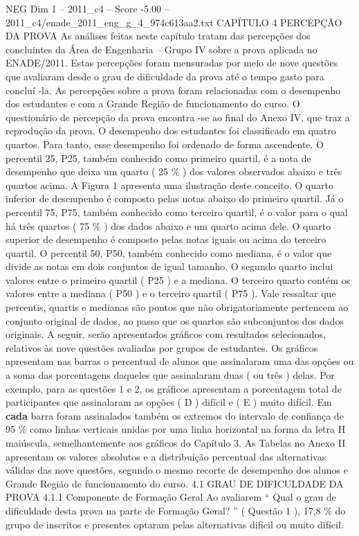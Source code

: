 \begin{textsample}{NEG Dim 1 – 2011\_c4 – Score -5.00 – 2011\_c4/enade\_2011\_eng\_g\_4\_974c613aa2.txt}  \label{ex:f1_neg_112}
CAPÍTULO 4 PERCEPÇÃO DA PROVA As análises feitas neste capítulo tratam das percepções dos concluintes da Área de Engenharia – Grupo IV sobre a prova aplicada no ENADE/2011.
Estas percepções foram mensuradas por meio de nove questões que avaliaram desde o grau de dificuldade da prova até o tempo gasto para concluí -la.
As percepções sobre a prova foram relacionadas com o desempenho dos estudantes e com a Grande Região de funcionamento do curso.
O questionário de percepção da prova encontra -se ao final do Anexo IV, que traz a reprodução da prova.
O desempenho dos estudantes foi classificado em quatro quartos.
Para tanto, esse desempenho foi ordenado de forma ascendente.
O percentil 25, P25, também conhecido como primeiro quartil, é a nota de desempenho que deixa um quarto ( 25 \% ) dos valores observados abaixo e três quartos acima.
A Figura 1 apresenta uma ilustração deste conceito.
O quarto inferior de desempenho é composto pelas notas abaixo do primeiro quartil.
Já o percentil 75, P75, também conhecido como terceiro quartil, é o valor para o qual há três quartos ( 75 \% ) dos dados abaixo e um quarto acima dele.
O quarto superior de desempenho é composto pelas notas iguais ou acima do terceiro quartil.
O percentil 50, P50, também conhecido como mediana, é o valor que divide as notas em dois conjuntos de igual tamanho.
O segundo quarto inclui valores entre o primeiro quartil ( P25 ) e a mediana.
O terceiro quarto contém os valores entre a mediana ( P50 ) e o terceiro quartil ( P75 ).
Vale ressaltar que percentis, quartis e medianas são pontos que não obrigatoriamente pertencem ao conjunto original de dados, ao passo que os quartos são subconjuntos dos dados originais.
A seguir, serão apresentados gráficos com resultados selecionados, relativos às nove questões avaliadas por grupos de estudantes.
Os gráficos apresentam nas barras o percentual de alunos que assinalaram uma das opções ou a soma das porcentagens daqueles que assinalaram duas ( ou três ) delas.
Por exemplo, para as questões 1 e 2, os gráficos apresentam a porcentagem total de participantes que assinalaram as opções ( D ) difícil e ( E ) muito difícil.
Em \textbf{cada} barra foram assinalados também os extremos do intervalo de confiança de 95 \% como linhas verticais unidas por uma linha horizontal na forma da letra H maiúscula, semelhantemente aos gráficos do Capítulo 3.
As Tabelas no Anexo II apresentam os valores absolutos e a distribuição percentual das alternativas válidas das nove questões, segundo o mesmo recorte de desempenho dos alunos e Grande Região de funcionamento do curso. 4.1 GRAU DE DIFICULDADE DA PROVA 4.1.1 Componente de Formação Geral Ao avaliarem “ Qual o grau de dificuldade desta prova na parte de Formação Geral? ” ( Questão 1 ), 17,8 \% do grupo de inscritos e presentes optaram pelas alternativas difícil ou muito difícil.

\end{textsample}
